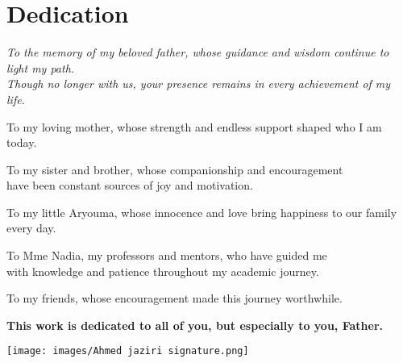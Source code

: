 \chapter*{\centering Dedication}

\begin{center}
{\itshape\large 
To the memory of my beloved father, whose guidance and wisdom continue to light my path. \\
Though no longer with us, your presence remains in every achievement of my life.

\vspace{0.8cm}

To my loving mother, whose strength and endless support shaped who I am today.

\vspace{0.8cm}

To my sister and brother, whose companionship and encouragement \\
have been constant sources of joy and motivation.

\vspace{0.8cm}

To my little Aryouma, whose innocence and love bring happiness to our family every day.

\vspace{0.8cm}

To Mme Nadia, my professors and mentors, who have guided me \\
with knowledge and patience throughout my academic journey.

\vspace{0.8cm}

To my friends, whose encouragement made this journey worthwhile.

\vspace{0.8cm}

\textbf{This work is dedicated to all of you, but especially to you, Father.}
}
\end{center}

\vspace{0.5cm}



\begin{flushright}
    \begin{minipage}{0.4\textwidth}
        \centering
        \texttt{[image: images/Ahmed jaziri signature.png]}\\
    \end{minipage}
\end{flushright}

\thispagestyle{empty} 